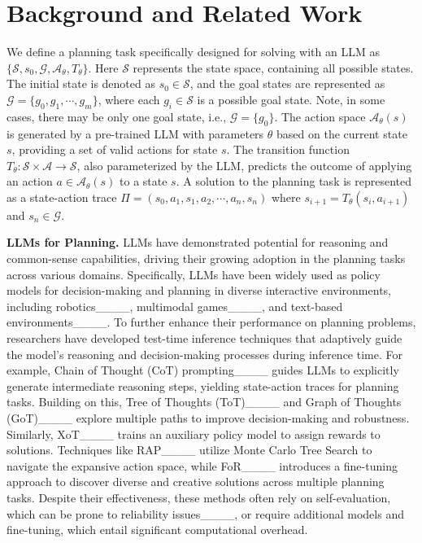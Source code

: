 \section{Background and Related Work}
We define a planning task specifically designed for solving with an LLM as $\{\mathcal{S}, s_0, \mathcal{G}, \mathcal{A}_\theta, T_\theta\}$. Here $\mathcal{S}$ represents the state space, containing all possible states. The initial state is denoted as $s_0 \in \mathcal{S}$, and the goal states are represented as $\mathcal{G} = \{ g_0,g_1, \cdots, g_m\}$, where each $g_i \in \mathcal{S}$ is a possible goal state. Note, in some cases, there may be only one goal state, i.e., $\mathcal{G} = \{ g_0\}$. The action space $\mathcal{A}_\theta(s)$ is generated by a pre-trained LLM with parameters $\theta$ based on the current state $s$, providing a set of valid actions for state $s$. The transition function $T_\theta : \mathcal{S} \times \mathcal{A} \rightarrow \mathcal{S}$, also parameterized by the LLM, predicts the outcome of applying an action $a \in \mathcal{A}_\theta(s)$ to a state $s$.  A solution to the planning task is represented as a state-action trace $\Pi = (s_0, a_1, s_1, a_2, \cdots, a_n,s_n )$ where $s_{i+1} = T_\theta(s_i, a_{i+1})$ and $s_n \in \mathcal{G}$.

\textbf{LLMs for Planning.} 
LLMs have demonstrated potential for reasoning and common-sense capabilities, driving their growing adoption in the planning tasks across various domains. Specifically, LLMs have been widely used as policy models for decision-making and planning in diverse interactive environments, including robotics____, multimodal games____, and text-based environments____. To further enhance their performance on planning problems, researchers have developed test-time inference techniques that adaptively guide the model's reasoning and decision-making processes during inference time. For example, Chain of Thought (CoT) prompting____ guides LLMs to explicitly generate intermediate reasoning steps, yielding state-action traces for planning tasks. Building on this, Tree of Thoughts (ToT)____ and Graph of Thoughts (GoT)____ explore multiple paths to improve decision-making and robustness. Similarly, XoT____ trains an auxiliary policy model to assign rewards to solutions. Techniques like RAP____ utilize Monte Carlo Tree Search to navigate the expansive action space, while FoR____ introduces a fine-tuning approach to discover diverse and creative solutions across multiple planning tasks. Despite their effectiveness, these methods often rely on self-evaluation, which can be prone to reliability issues____, or require additional models and fine-tuning, which entail significant computational overhead.

